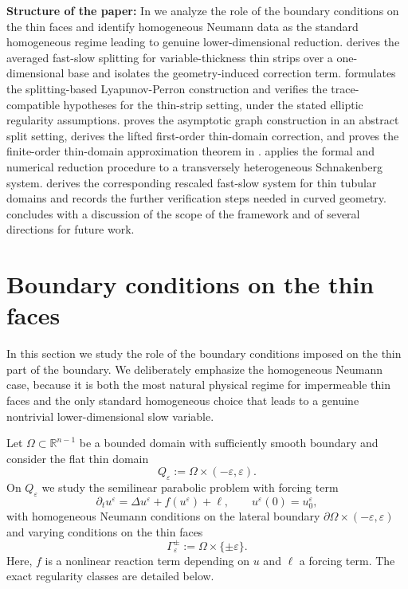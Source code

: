 \documentclass[11pt]{article}
\theoremstyle{definition}
\theoremstyle{remark}
\numberwithin{equation}{section}
\newcommand{\eps}{\varepsilon}
\newcommand{\R}{\mathbb{R}}
\newcommand{\Qe}{Q_\varepsilon}
\newcommand{\Om}{\Omega}
\begin{document}
\textbf{Structure of the paper:}
In  we analyze the role of the boundary conditions on the thin faces and identify homogeneous Neumann data as the standard homogeneous regime leading to genuine
lower-dimensional reduction.
 derives the averaged fast-slow splitting for variable-thickness thin strips over a one-dimensional base and isolates the geometry-induced correction term.
 formulates the splitting-based Lyapunov-Perron construction and verifies the trace-compatible hypotheses for the thin-strip setting, under the stated elliptic regularity assumptions.
 proves the asymptotic graph construction in an abstract split setting, derives the lifted first-order thin-domain correction, and proves the finite-order thin-domain approximation theorem in .
 applies the formal and numerical reduction procedure to a transversely heterogeneous Schnakenberg system.
 derives the corresponding rescaled fast-slow system for thin tubular domains and records the further verification steps needed in curved geometry. 
 concludes with a discussion of the scope of the framework and of several directions for future work.


\section{Boundary conditions on the thin faces}\label{sec:boundary}

In this section we study the role of the boundary conditions imposed on the thin part of the boundary. We deliberately emphasize the homogeneous Neumann case, because it is both the most natural physical regime for impermeable thin faces and the only standard homogeneous choice that leads to a genuine nontrivial lower-dimensional slow variable.

Let $\Om\subset \R^{n-1}$ be a bounded domain with sufficiently smooth boundary and consider the flat thin domain
\[
\Qe := \Om\times (-\eps,\eps).
\]
On $\Qe$ we study the semilinear parabolic problem with forcing term
\begin{equation}\label{eq:flat-physical}
\partial_t  u^\eps = \Delta  u^\eps + f( u^\eps)+\ell,
\qquad  u^\eps(0)= u_0^\eps,
\end{equation}
with homogeneous Neumann conditions on the lateral boundary $\partial\Om\times(-\eps,\eps)$ and varying conditions on the thin faces
\[
\Gamma_\eps^{\pm}:=\Om\times\{\pm\eps\}.
\]
Here, $f$ is a nonlinear reaction term depending on $u$ and $\ell$ a forcing term. The exact regularity classes are detailed below.
\end{document}

